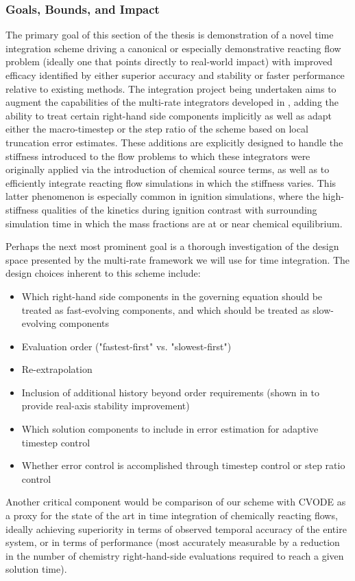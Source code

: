 \subsubsection{Goals, Bounds, and Impact}

The primary goal of this section of the thesis is demonstration of a novel
time integration scheme driving a canonical or especially demonstrative
reacting flow problem (ideally one that points directly to real-world impact)
with improved efficacy identified by either superior accuracy and stability or
faster performance relative to existing methods. The integration project
being undertaken aims to augment the capabilities of the multi-rate integrators
developed in \cite{mikida2019multi}, adding the ability to treat certain
right-hand side components implicitly as well as adapt either the macro-timestep
or the step ratio of the scheme based on local truncation error estimates. These
additions are explicitly designed to handle the stiffness introduced to the flow
problems to which these integrators were originally applied via the introduction
of chemical source terms, as well as to efficiently integrate reacting flow
simulations in which the stiffness varies. This latter phenomenon is especially
common in ignition simulations, where the high-stiffness qualities of the
kinetics during ignition contrast with surrounding simulation time in which
the mass fractions are at or near chemical equilibrium.

Perhaps the next most prominent goal is a thorough investigation of
the design space presented by the multi-rate framework we will use for time
integration. The design choices inherent to this
scheme include:
\begin{itemize}
\item{Which right-hand side components in the governing equation should be treated as
      fast-evolving components, and which should be treated as slow-evolving components}
\item{Evaluation order ("fastest-first" vs. "slowest-first")}
\item{Re-extrapolation}
\item{Inclusion of additional history beyond order requirements (shown in \cite{mikida2019multi} to provide real-axis stability improvement)}
\item{Which solution components to include in error estimation for adaptive timestep
      control}
\item{Whether error control is accomplished through timestep control or step ratio control}
\end{itemize}
Another critical component would be comparison of our scheme with CVODE as
a proxy for the state of the art in time integration of chemically reacting
flows, ideally achieving superiority in terms of observed temporal accuracy
of the entire system, or in terms of performance (most accurately measurable
by a reduction in the number of chemistry right-hand-side evaluations required
to reach a given solution time).

